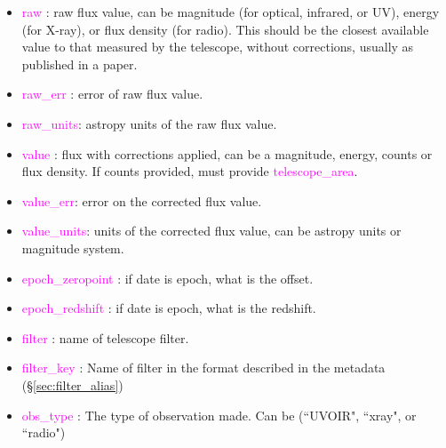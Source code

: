 \documentclass[tighten]{aastex631}
\newcommand{\keyword}[1]{\textcolor{magenta}{#1}}
\begin{document}
\begin{itemize}
    \item \keyword{raw} : raw flux value, can be magnitude (for optical, infrared, or UV), energy (for X-ray), or flux density (for radio). This should be the closest available value to that measured by the telescope, without corrections, usually as published in a paper.
    \item \keyword{raw\_err} : error of raw flux value.
    \item \keyword{raw\_units}: astropy units of the raw flux value.
    \item \keyword{value} : flux with corrections applied, can be a magnitude, energy, counts or flux density. If counts provided, must provide \keyword{telescope\_area}.
    \item \keyword{value\_err}: error on the corrected flux value.
    \item \keyword{value\_units}: units of the corrected flux value, can be astropy units or magnitude system.
    \item \keyword{epoch\_zeropoint} : if date is epoch, what is the offset.
    \item \keyword{epoch\_redshift} : if date is epoch, what is the redshift.
    \item \keyword{filter} : name of telescope filter.
    \item \keyword{filter\_key} : Name of filter in the format described in the metadata (\S\ref{sec:filter_alias})
    \item \keyword{obs\_type} : The type of observation made. Can be (``UVOIR", ``xray", or ``radio")

\end{itemize}
\end{document}
